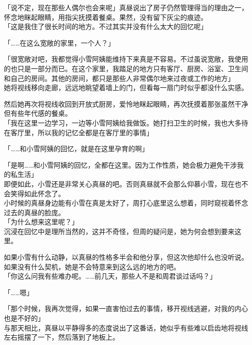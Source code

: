 「说不定，现在那些人偶尔也会来呢」真昼说出了房子仍然管理得当的理由之一，怀念地眯起眼睛，用指尖抚摸着餐桌。果然，没有留下灰尘的痕迹。\\

「这是我住了很长时间的地方。不过其实并没有什么太大的回忆呢」

「……在这么宽敞的家里，一个人？」

「很宽敞对吧，我都觉得小雪阿姨能维持下来真是不容易。不过虽说宽敞，我使用的也只是一部分而已。在这个家里，我踏足的地方只有客厅、厨房、浴室、卫生间和自己的房间。其他的房间，都只是那些人非常偶尔地来过夜或工作的地方」\\

她将视线移向走廊，远远地眺望着墙上的门，但看每一扇门时似乎都没什么实感。

然后她再次将视线收回到开放式厨房，爱怜地眯起眼睛，再次抚摸着那张虽然干净但有些年代感的餐桌。\\

「我在这里一边学习，一边等小雪阿姨给我做饭。她打扫卫生的时候，我也大多待在客厅里，所以我的记忆全都是在客厅里的事情」

「……和小雪阿姨的回忆，就是在这里孕育的啊」

「是啊……和小雪阿姨的回忆，全都在这里。因为工作性质，她会极力避免干涉我的私生活」\\

即便如此，小雪还是非常关心真昼的吧。否则真昼就不会那么仰慕小雪，现在也不会笑得如此怀念了。\\

小时候的真昼身边能有小雪在真是太好了，周打心底里这么想着，同时窥视着怀念过去的真昼的脸庞。\\

「为什么想来这里呢？」\\

沉浸在回忆中是理所当然的，这并不奇怪，但周的疑问是，她为何会想到要来这里。

如果小雪有什么动静，以真昼的性格多半会和他分享，但这次他却什么也没听说。如果没有什么契机，她是不会特意来到这么远的地方的吧。\\

「你这么问我有些难办呢。……前几天，那些人不是和周君谈过话吗？」

「……嗯」

「那个时候，我再次觉得，如果一直害怕过去的事情，移开视线逃避，对我的内心也是不好的」\\

与那天相比，真昼以平静得多的态度说出了这番话，她似乎有些难以启齿地将视线左右摇摆了一下，然后落到了地板上。\\


